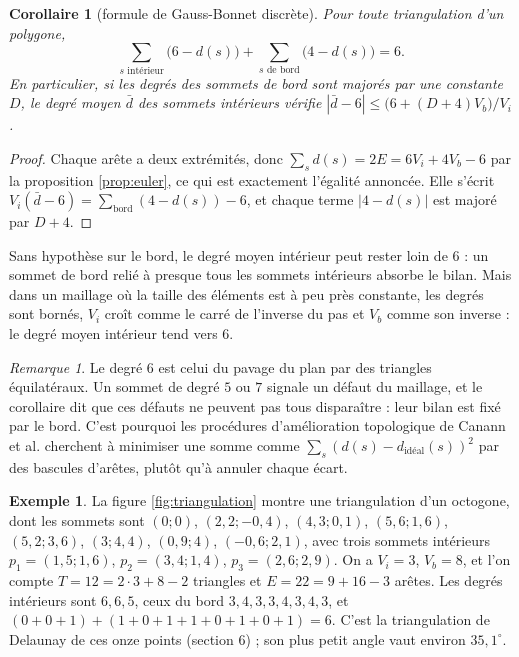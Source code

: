 \documentclass[11pt,a4paper]{article}
\theoremstyle{plain}
\newtheorem{corollaire}[theoreme]{Corollaire}
\theoremstyle{definition}
\newtheorem{exemple}[theoreme]{Exemple}
\theoremstyle{remark}
\newtheorem{remarque}[theoreme]{Remarque}
\begin{document}
\begin{corollaire}[formule de Gauss-Bonnet discrète]\label{cor:valences}
Pour toute triangulation d'un polygone,
\[
  \sum_{s\text{ intérieur}}\big(6-d(s)\big)+\sum_{s\text{ de bord}}\big(4-d(s)\big)=6.
\]
En particulier, si les degrés des sommets de bord sont majorés par une constante $D$, le degré moyen $\bar d$ des sommets intérieurs vérifie $|\bar d-6|\leq\big(6+(D+4)V_b\big)/V_i$.
\end{corollaire}

\begin{proof}
Chaque arête a deux extrémités, donc $\sum_sd(s)=2E=6V_i+4V_b-6$ par la proposition \ref{prop:euler}, ce qui est exactement l'égalité annoncée. Elle s'écrit $V_i(\bar d-6)=\sum_{\text{bord}}(4-d(s))-6$, et chaque terme $|4-d(s)|$ est majoré par $D+4$.
\end{proof}

Sans hypothèse sur le bord, le degré moyen intérieur peut rester loin de $6$ : un sommet de bord relié à presque tous les sommets intérieurs absorbe le bilan. Mais dans un maillage où la taille des éléments est à peu près constante, les degrés sont bornés, $V_i$ croît comme le carré de l'inverse du pas et $V_b$ comme son inverse : le degré moyen intérieur tend vers $6$.

\begin{remarque}
Le degré $6$ est celui du pavage du plan par des triangles équilatéraux. Un sommet de degré $5$ ou $7$ signale un défaut du maillage, et le corollaire dit que ces défauts ne peuvent pas tous disparaître : leur bilan est fixé par le bord. C'est pourquoi les procédures d'amélioration topologique de Canann et al. \cite{canann} cherchent à minimiser une somme comme $\sum_s(d(s)-d_{\text{idéal}}(s))^2$ par des bascules d'arêtes, plutôt qu'à annuler chaque écart.
\end{remarque}

\begin{exemple}\label{ex:delaunay11}
La figure \ref{fig:triangulation} montre une triangulation d'un octogone, dont les sommets sont $(0;0)$, $(2{,}2;-0{,}4)$, $(4{,}3;0{,}1)$, $(5{,}6;1{,}6)$, $(5{,}2;3{,}6)$, $(3;4{,}4)$, $(0{,}9;4)$, $(-0{,}6;2{,}1)$, avec trois sommets intérieurs $p_1=(1{,}5;1{,}6)$, $p_2=(3{,}4;1{,}4)$, $p_3=(2{,}6;2{,}9)$. On a $V_i=3$, $V_b=8$, et l'on compte $T=12=2\cdot3+8-2$ triangles et $E=22=9+16-3$ arêtes. Les degrés intérieurs sont $6,6,5$, ceux du bord $3,4,3,3,4,3,4,3$, et $(0+0+1)+(1+0+1+1+0+1+0+1)=6$. C'est la triangulation de Delaunay de ces onze points (section 6) ; son plus petit angle vaut environ $35{,}1^\circ$.
\end{exemple}
\end{document}

